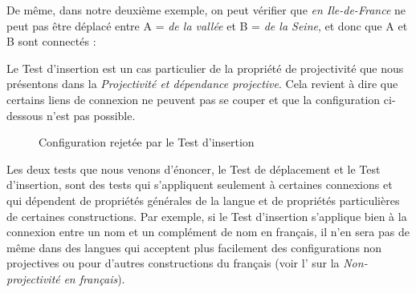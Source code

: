 De même, dans notre deuxième exemple, on peut vérifier que \textit{en Ile-de-France} ne peut pas être déplacé entre A = \textit{de la vallée} et B = \textit{de la Seine}, et donc que A et B sont connectés :

\z

Le Test d’insertion est un cas particulier de la propriété de projectivité que nous présentons dans la  \textit{Projectivité et dépendance projective}. Cela revient à dire que certains liens de connexion ne peuvent pas se couper et que la configuration ci-dessous n’est pas possible.

\begin{figure}
\caption{Configuration rejetée par le Test d’insertion}
\end{figure}

Les deux tests que nous venons d’énoncer, le Test de déplacement et le Test d’insertion, sont des tests qui s’appliquent seulement à certaines connexions et qui dépendent de propriétés générales de la langue et de propriétés particulières de certaines constructions. Par exemple, si le Test d’insertion s’applique bien à la connexion entre un nom et un complément de nom en français, il n’en sera pas de même dans des langues qui acceptent plus facilement des configurations non projectives ou pour d’autres constructions du français (voir l' sur la \textit{Non-projectivité} \textit{en français}).

